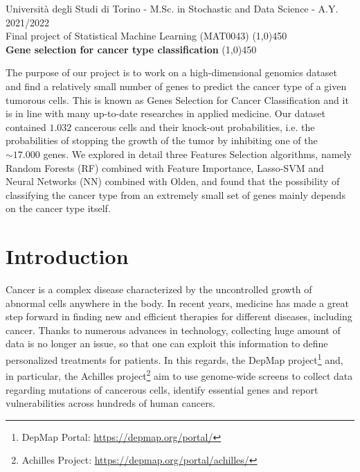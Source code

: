 \documentclass[a4paper,11pt, oneside]{article}  %
\begin{document}
\setcounter{secnumdepth}{2}
\pagestyle{plain} %

\begin{center}
	Università degli Studi di Torino - M.Sc.  in Stochastic and Data Science - A.Y.  2021/2022 \\
	\Large { Final project of Statistical Machine Learning (MAT0043)}
	\line(1,0){450}\\ 
	\vspace{0.4cm} 
	{ \huge \textbf{Gene selection for cancer type classification} }
	\vspace{0.1cm}
	\line(1,0){450} \\
\end{center}


The purpose of our project is to work on a high-dimensional genomics dataset and find a relatively small number of genes to predict the cancer type of a given tumorous cells. This is known as Genes Selection for Cancer Classification and it is in line with many up-to-date researches in applied medicine.  Our dataset contained $1.032$ cancerous cells and their knock-out probabilities, i.e.  the probabilities of stopping the growth of the tumor by inhibiting one of the $\sim 17.000$ genes.  We explored in detail three Features Selection algorithms,  namely Random Forests (RF) combined with Feature Importance,  Lasso-SVM and Neural Networks (NN) combined with Olden,  and found that the possibility of classifying the cancer type from an extremely small set of genes mainly depends on the cancer type itself.  


\section{Introduction}
Cancer is a complex disease characterized by the uncontrolled growth of abnormal cells anywhere in the body.  In recent years,  medicine has made a great step forward in finding new and efficient therapies for different diseases,  including cancer.  Thanks to numerous advances in technology,  collecting huge amount of data is no longer an issue,  so that one can exploit this information to define personalized treatments for patients.  In this regards,  the DepMap project\footnote{DepMap Portal: \url{https://depmap.org/portal/} } and,  in particular,  the Achilles project\footnote{Achilles Project: \url{https://depmap.org/portal/achilles/} } aim to use genome-wide screens to collect data regarding mutations of cancerous cells,  identify essential genes and report vulnerabilities across hundreds of human cancers. 
\end{document}
